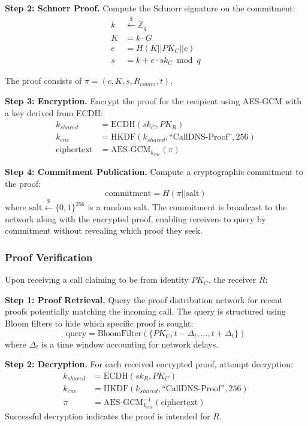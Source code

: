 \documentclass[11pt,twocolumn]{article}
\begin{document}
\textbf{Step 2: Schnorr Proof.} Compute the Schnorr signature on the commitment:
\begin{align}
k &\xleftarrow{\$} \mathbb{Z}_q \\
K &= k \cdot G \\
e &= H(K || PK_C || c) \\
s &= k + e \cdot sk_C \bmod q
\end{align}

The proof consists of $\pi = (c, K, s, R_{comm}, t)$.

\textbf{Step 3: Encryption.} Encrypt the proof for the recipient using AES-GCM with a key derived from ECDH:
\begin{align}
k_{shared} &= \text{ECDH}(sk_C, PK_R) \\
k_{enc} &= \text{HKDF}(k_{shared}, \text{``CallDNS-Proof''}, 256) \\
\text{ciphertext} &= \text{AES-GCM}_{k_{enc}}(\pi)
\end{align}

\textbf{Step 4: Commitment Publication.} Compute a cryptographic commitment to the proof:
\begin{equation}
\text{commitment} = H(\pi || \text{salt})
\end{equation}
where $\text{salt} \xleftarrow{\$} \{0,1\}^{256}$ is a random salt. The commitment is broadcast to the network along with the encrypted proof, enabling receivers to query by commitment without revealing which proof they seek.

\subsubsection{Proof Verification}

Upon receiving a call claiming to be from identity $PK_C$, the receiver $R$:

\textbf{Step 1: Proof Retrieval.} Query the proof distribution network for recent proofs potentially matching the incoming call. The query is structured using Bloom filters to hide which specific proof is sought:
\begin{equation}
\text{query} = \text{BloomFilter}(\{PK_C, t - \Delta_t, ..., t + \Delta_t\})
\end{equation}
where $\Delta_t$ is a time window accounting for network delays.

\textbf{Step 2: Decryption.} For each received encrypted proof, attempt decryption:
\begin{align}
k_{shared} &= \text{ECDH}(sk_R, PK_C) \\
k_{enc} &= \text{HKDF}(k_{shared}, \text{``CallDNS-Proof''}, 256) \\
\pi &= \text{AES-GCM}_{k_{enc}}^{-1}(\text{ciphertext})
\end{align}
Successful decryption indicates the proof is intended for $R$.
\end{document}
